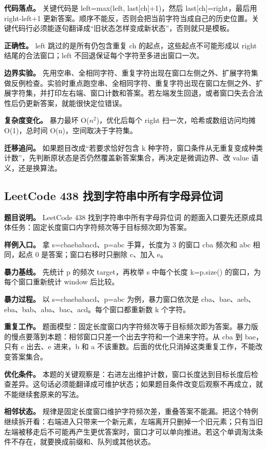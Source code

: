 \textbf{代码落点。} 关键代码是 left=max(left, last[ch]+1)，然后 last[ch]=right，最后用 right-left+1 更新答案。顺序不能反，否则会把当前字符当成自己的历史位置。关键代码行必须能逐句翻译成“旧状态怎样变成新状态”，否则就只是模板。

\textbf{正确性。} left 跳过的是所有仍包含重复 ch 的起点，这些起点不可能形成以 right 结尾的合法窗口；left 不回退保证每个字符至多进出窗口一次。

\textbf{边界实验。} 先用空串、全相同字符、重复字符出现在窗口左侧之外、扩展字符集做反例检查。实验时重点跑空串、全相同字符、重复字符出现在窗口左侧之外、扩展字符集，并打印左右端、窗口计数和答案。若左端发生回退，或者窗口失去合法性后仍更新答案，就能很快定位错误。

\textbf{复杂度变化。} 暴力最坏 O(\ensuremath{n^{2}})，优化后每个 right 扫一次，哈希或数组访问均摊 O(1)，总时间 O(n)，空间取决于字符集。

\textbf{迁移追问。} 如果题目改成“若要求恰好包含 k 种字符，窗口条件从无重复变成种类计数”，先判断原状态是否仍然覆盖新答案集合，再决定是微调边界、改 value 语义，还是换算法。

\subsection{LeetCode 438 找到字符串中所有字母异位词}

\textbf{题目说明。} LeetCode 438 找到字符串中所有字母异位词 的题面入口要先还原成具体任务：固定长度窗口内字符频次等于目标频次即为答案。

\textbf{样例入口。} 拿 s=cbaebabacd、p=abc 手算，长度为 3 的窗口 cba 频次和 abc 相同，起点 0 是答案；窗口右移时只删除 c、加入 e。

\textbf{暴力基线。} 先统计 p 的频次 target，再枚举 s 中每个长度 k=p.size() 的窗口，为每个窗口重新统计 window 后比较。

\textbf{暴力过程。} 以 s=cbaebabacd、p=abc 为例，暴力窗口依次是 cba、bae、aeb、eba、bab、aba、bac、acd。每个窗口都重新数 k 个字符。

\textbf{重复工作。} 题面模型：固定长度窗口内字符频次等于目标频次即为答案。暴力版的慢点要落到本题：相邻窗口只差一个出去字符和一个进来字符。从 cba 到 bae，只有 c 出去、e 进来，b 和 a 不该重数。后面的优化只消掉这类重复工作，不能改变答案集合。

\textbf{优化条件。} 本题的关键观察是：右进左出维护计数，窗口长度达到目标长度后检查差异。这句话必须能翻译成可维护状态；如果题目条件改变后观察不再成立，就不能继续套原来的写法。

\textbf{相邻状态。} 规律是固定长度窗口维护字符频次差，重叠答案不能漏。把这个特例继续拆开看：右端进入只带来一个新元素，左端离开只删掉一个旧元素；只有当旧左端被移走后不可能再产生更优答案时，窗口才可以单向推进。若这个单调淘汰条件不存在，就要换成前缀和、队列或其他状态。

